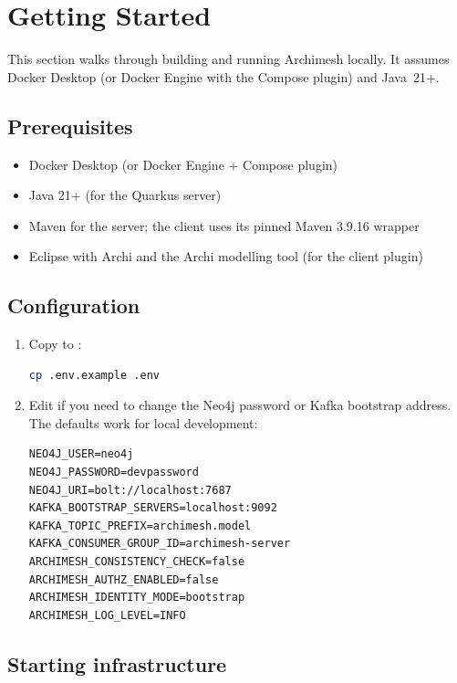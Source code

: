 \section{Getting Started}
\label{sec:GettingStarted}

This section walks through building and running Archimesh locally. It assumes
Docker Desktop (or Docker Engine with the Compose plugin) and Java~21+.

\subsection{Prerequisites}

\begin{itemize}
\item Docker Desktop (or Docker Engine + Compose plugin)
\item Java 21+ (for the Quarkus server)
\item Maven for the server; the client uses its pinned Maven 3.9.16 wrapper
\item Eclipse with Archi and the Archi modelling tool (for the client plugin)
\end{itemize}

\subsection{Configuration}

\begin{enumerate}
\item Copy  to :
\begin{lstlisting}[language=bash,caption={Setup environment}]
cp .env.example .env
\end{lstlisting}

\item Edit  if you need to change the Neo4j password or Kafka
  bootstrap address. The defaults work for local development:
\begin{lstlisting}[caption={Default .env values}]
NEO4J_USER=neo4j
NEO4J_PASSWORD=devpassword
NEO4J_URI=bolt://localhost:7687
KAFKA_BOOTSTRAP_SERVERS=localhost:9092
KAFKA_TOPIC_PREFIX=archimesh.model
KAFKA_CONSUMER_GROUP_ID=archimesh-server
ARCHIMESH_CONSISTENCY_CHECK=false
ARCHIMESH_AUTHZ_ENABLED=false
ARCHIMESH_IDENTITY_MODE=bootstrap
ARCHIMESH_LOG_LEVEL=INFO
\end{lstlisting}
\end{enumerate}

\subsection{Starting infrastructure}

